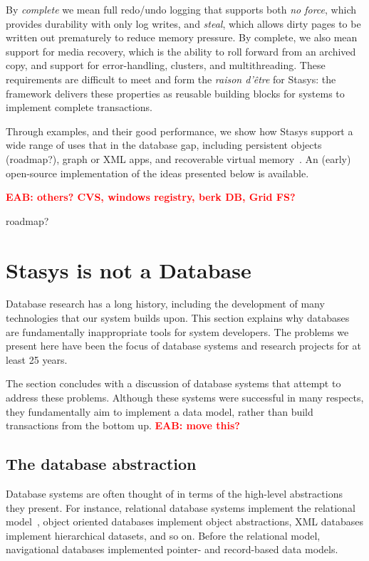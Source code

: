 \documentclass[letterpaper,twocolumn,10pt]{article}
\newcommand{\yad}{Stasys\xspace}
\newcommand{\eab}[1]{\textcolor{red}{\bf EAB: #1}}
\begin{document}
By {\em complete} we mean full redo/undo logging that supports
both {\em no force}, which provides durability with only log writes,
and {\em steal}, which allows dirty pages to be written out prematurely
to reduce memory pressure. By complete, we also
mean support for media recovery, which is the ability to roll
forward from an archived copy, and support for error-handling,
clusters, and multithreading. These requirements are difficult
to meet and form the {\em raison d'\^etre} for \yad{}: the framework
delivers these properties as reusable building blocks for systems
to implement complete transactions.

Through examples, and their good performance, we show how \yad{}
support a wide range of uses that in the database gap, including
persistent objects (roadmap?), graph or XML apps, and recoverable
virtual memory~\cite{lrvm}.  An (early) open-source implementation of
the ideas presented below is available.

\eab{others?  CVS, windows registry, berk DB, Grid FS?}

roadmap?



\section{\yad is not a Database}

Database research has a long history, including the development of
many technologies that our system builds upon.  This section explains
why databases are fundamentally inappropriate tools for system
developers.  The problems we present here have been the focus of
database systems and research projects for at least 25 years.

The section concludes with a discussion of database systems that
attempt to address these problems.  Although these systems were
successful in many respects, they fundamentally aim to implement a
data model, rather than build transactions from the bottom up. \eab{move this?}


\subsection{The database abstraction}

Database systems are often thought of in terms of the high-level
abstractions they present.  For instance, relational database systems
implement the relational model~\cite{cobb}, object oriented
databases implement object abstractions, XML databases implement
hierarchical datasets, and so on.  Before the relational model,
navigational databases implemented pointer- and record-based data models.
\end{document}
